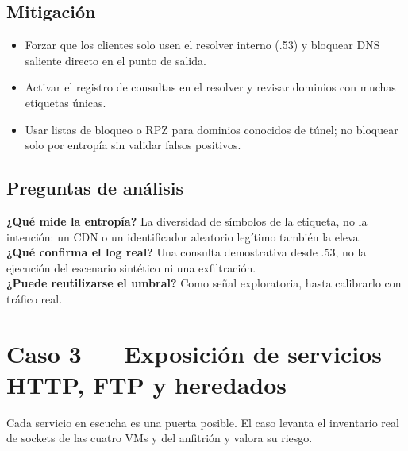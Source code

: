 \subsection{Mitigación}
\begin{itemize}
\item Forzar que los clientes solo usen el resolver interno (.53) y bloquear DNS saliente directo en el punto de salida.
\item Activar el registro de consultas en el resolver y revisar dominios con muchas etiquetas únicas.
\item Usar listas de bloqueo o RPZ para dominios conocidos de túnel; no bloquear solo por entropía sin validar falsos positivos.
\end{itemize}

\subsection{Preguntas de análisis}
\textbf{¿Qué mide la entropía?} La diversidad de símbolos de la etiqueta, no la intención: un CDN o un identificador aleatorio legítimo también la eleva.\\
\textbf{¿Qué confirma el log real?} Una consulta demostrativa desde .53, no la ejecución del escenario sintético ni una exfiltración.\\
\textbf{¿Puede reutilizarse el umbral?} Como señal exploratoria, hasta calibrarlo con tráfico real.

\section{Caso 3 — Exposición de servicios HTTP, FTP y heredados}
Cada servicio en escucha es una puerta posible. El caso levanta el inventario real de sockets de las cuatro VMs y del anfitrión y valora su riesgo.

